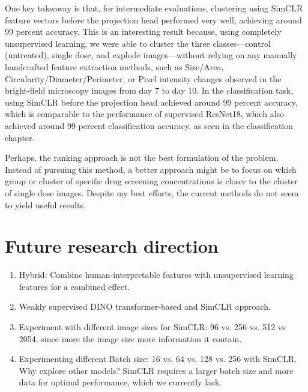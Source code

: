 One key takeaway is that, for intermediate evaluations, clustering using SimCLR feature vectors before the projection head performed very well, achieving around 99 percent accuracy. This is an interesting result because, using completely unsupervised learning, we were able to cluster the three classes—control (untreated), single dose, and explode images—without relying on any manually handcrafted feature extraction methods, such as Size/Area, Circularity/Diameter/Perimeter, or Pixel intensity changes observed in the bright-field microscopy images from day 7 to day 10. In the classification task, using SimCLR before the projection head achieved around 99 percent accuracy, which is comparable to the performance of supervised ResNet18, which also achieved around 99 percent classification accuracy, as seen in the classification chapter.

Perhaps, the ranking approach is not the best formulation of the problem. Instead of pursuing this method, a better approach might be to focus on which group or cluster of specific drug screening concentrations is closer to the cluster of single dose images. Despite my best efforts, the current methods do not seem to yield useful results.

\section{Future research direction}

\begin{enumerate} 
	\item Hybrid: Combine human-interpretable features with unsupervised learning features for a combined effect. 
	\item Weakly supervised DINO transformer-based and SimCLR approach.
	 \item Experiment with different image sizes for SimCLR: 96 vs. 256 vs. 512 vs 2054. since more the image size more information it contain.
	  \item Experimenting different Batch size: 16 vs. 64 vs. 128 vs. 256 with SimCLR. Why explore other models? SimCLR requires a larger batch size and more data for optimal performance, which we currently lack. 
\end{enumerate}
